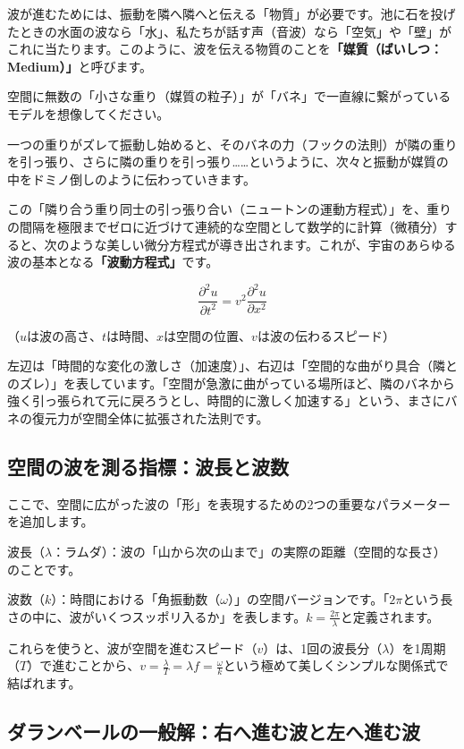 波が進むためには、振動を隣へ隣へと伝える「物質」が必要です。池に石を投げたときの水面の波なら「水」、私たちが話す声（音波）なら「空気」や「壁」がこれに当たります。このように、波を伝える物質のことを\textbf{「媒質（ばいしつ：Medium）」}と呼びます。

空間に無数の「小さな重り（媒質の粒子）」が「バネ」で一直線に繋がっているモデルを想像してください。

一つの重りがズレて振動し始めると、そのバネの力（フックの法則）が隣の重りを引っ張り、さらに隣の重りを引っ張り\ldots{}\ldots{}というように、次々と振動が媒質の中をドミノ倒しのように伝わっていきます。

この「隣り合う重り同士の引っ張り合い（ニュートンの運動方程式）」を、重りの間隔を極限までゼロに近づけて連続的な空間として数学的に計算（微積分）すると、次のような美しい微分方程式が導き出されます。これが、宇宙のあらゆる波の基本となる\textbf{「波動方程式」}です。

\[\frac{\partial^2 u}{\partial t^2} = v^2 \frac{\partial^2 u}{\partial x^2}\]

（\(u\)は波の高さ、\(t\)は時間、\(x\)は空間の位置、\(v\)は波の伝わるスピード）

左辺は「時間的な変化の激しさ（加速度）」、右辺は「空間的な曲がり具合（隣とのズレ）」を表しています。「空間が急激に曲がっている場所ほど、隣のバネから強く引っ張られて元に戻ろうとし、時間的に激しく加速する」という、まさにバネの復元力が空間全体に拡張された法則です。

\subsection{空間の波を測る指標：波長と波数}

ここで、空間に広がった波の「形」を表現するための2つの重要なパラメーターを追加します。

波長（\(\lambda\)：ラムダ）：波の「山から次の山まで」の実際の距離（空間的な長さ）のことです。

波数（\(k\)）：時間における「角振動数（\(\omega\)）」の空間バージョンです。「\(2\pi\)という長さの中に、波がいくつスッポリ入るか」を表します。\(k = \frac{2\pi}{\lambda}\)と定義されます。

これらを使うと、波が空間を進むスピード（\(v\)）は、1回の波長分（\(\lambda\)）を1周期（\(T\)）で進むことから、\(v = \frac{\lambda}{T} = \lambda f = \frac{\omega}{k}\)という極めて美しくシンプルな関係式で結ばれます。

\subsection{ダランベールの一般解：右へ進む波と左へ進む波}

